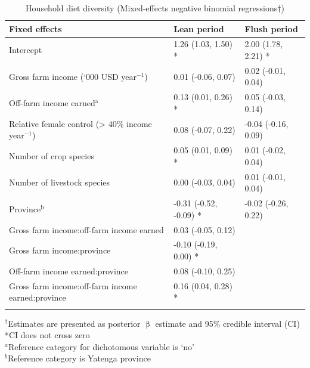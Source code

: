 \begin{table}[H]
  \captionsetup{singlelinecheck = false, justification=justified} %
  \caption{Household diet diversity (Mixed-effects negative binomial regressions${\dag}$)}
  \label{tab:05_4}
  \small
\begin{tabularx}{\textwidth}{@{}lYY@{}}
\toprule
 Fixed effects & Lean period & Flush period \\
 \midrule
Intercept & 1.26 (1.03, 1.50) * & 2.00 (1.78, 2.21) * \\
Gross farm income (`000 USD year$^{-1}$) & 0.01 (-0.06, 0.07) & 0.02 (-0.01, 0.04) \\
Off-farm income earned$^{\mathrm{a}}$ & 0.13 (0.01, 0.26) * & 0.05 (-0.03, 0.14) \\
Relative female control ({\textgreater} 40\% income year$^{-1}$) & 0.08 (-0.07, 0.22) & -0.04 (-0.16, 0.09) \\
Number of crop species & 0.05 (0.01, 0.09) * & 0.01 (-0.02, 0.04) \\
Number of livestock species & 0.00 (-0.03, 0.04) & 0.01 (-0.01, 0.04) \\
Province$^{\mathrm{b}}$ & -0.31 (-0.52, -0.09) * & -0.02 (-0.26, 0.22) \\
\midrule
Gross farm income:off-farm income earned & 0.03 (-0.05, 0.12) & \\
Gross farm income:province & -0.10 (-0.19, 0.00) * & \\
Off-farm income earned:province & 0.08 (-0.10, 0.25) & \\
Gross farm income:off-farm income earned:province & 0.16 (0.04, 0.28) * & \\
\bottomrule
\end{tabularx}
\footnotesize
\raggedright
$^{\dag}$Estimates are presented as posterior ${\upbeta}$ estimate and 95\% credible interval (CI)\\
*CI does not cross zero\\
$^a$Reference category for dichotomous variable is `no'\\
$^b$Reference category is Yatenga province\\%
\end{table}





